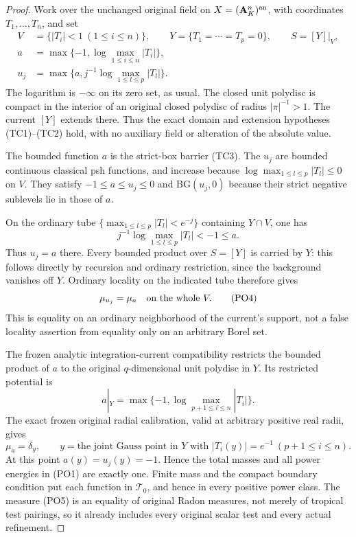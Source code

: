 \documentclass[11pt,a4paper]{article}
\numberwithin{equation}{section}
\theoremstyle{definition}
\theoremstyle{remark}
\begin{document}
\begin{proof}
Work over the unchanged original field on
$X=(\mathbf A_K^n)^{\rm an}$, with coordinates
$T_1,\ldots,T_n$, and set
\[
 \begin{split}
 V&=\{|T_i|<1\ (1\leq i\leq n)\},\qquad
 Y=\{T_1=\cdots=T_p=0\},\qquad S=[Y]|_V,\\
 a&=\max\{-1,\log\max_{1\leq i\leq n}|T_i|\},\\
 u_j&=\max\{a,j^{-1}\log\max_{1\leq l\leq p}|T_l|\}.
 \end{split}
 \tag{PO3}
\]
The logarithm is $-\infty$ on its zero set, as usual.
The closed unit polydisc is compact in the interior of an
original closed polydisc of radius $|\pi|^{-1}>1$.
The current $[Y]$ extends there. Thus the exact domain and
extension hypotheses (TC1)--(TC2) hold, with no auxiliary
field or alteration of the absolute value.

The bounded function $a$ is the strict-box barrier (TC3).
The $u_j$ are bounded continuous classical psh functions,
and increase because $\log\max_{1\leq l\leq p}|T_l|\leq0$ on $V$.
They satisfy $-1\leq a\leq u_j\leq0$ and
$\mathrm{BG}(u_j,0)$ because their strict negative
sublevels lie in those of $a$.

On the ordinary tube $\{\max_{1\leq l\leq p}|T_l|<e^{-j}\}$
containing $Y\cap V$, one has
\[
                 j^{-1}\log\max_{1\leq l\leq p}|T_l|<-1\leq a.
\]
Thus $u_j=a$ there.
Every bounded product over $S=[Y]$ is carried by $Y$:
this follows directly by recursion and ordinary restriction,
since the background vanishes off $Y$.
Ordinary locality on the indicated tube therefore gives
\[
                             \mu_{u_j}=\mu_a
                              \quad\hbox{on the whole }V.
 \tag{PO4}
\]
This is equality on an ordinary neighborhood of the current's
support, not a false locality assertion from equality only
on an arbitrary Borel set.

The frozen analytic integration-current compatibility restricts
the bounded product of $a$ to the original $q$-dimensional
unit polydisc in $Y$. Its restricted potential is
\[
                 a|_Y=\max\{-1,\log\max_{p+1\leq i\leq n}|T_i|\}.
\]
The exact frozen original radial calibration, valid at arbitrary
positive real radii, gives
\[
                \mu_a=\delta_y,\qquad
     y=\text{the joint Gauss point in $Y$ with }|T_i(y)|=e^{-1}
                           \ (p+1\leq i\leq n).
 \tag{PO5}
\]
At this point $a(y)=u_j(y)=-1$. Hence the total masses and
all power energies in (PO1) are exactly one. Finite mass and
the compact boundary condition put each function in
$\mathscr T_0$, and hence in every positive power class.
The measure (PO5) is an equality of original Radon measures,
not merely of tropical test pairings, so it already includes
every original scalar test and every actual refinement.


\end{proof}
\end{document}
